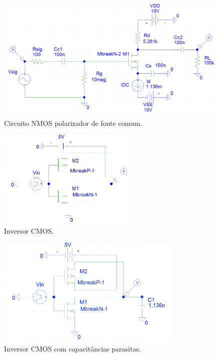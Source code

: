 \documentclass[12pt, a4paper]{article}
\begin{document}
    \begin{figure}[h!] 
        \centering
        \includegraphics[width=1\textwidth]{circ32}
        \caption{Circuito NMOS polarizador de fonte comum.}        
        \label{circ32}
    \end{figure}
    
    \newpage
    
    \begin{figure}[h!] 
        \centering
        \includegraphics[width=0.6\textwidth]{circ331}
        \caption{Inversor CMOS.}        
        \label{circ331}
    \end{figure}
    
    \begin{figure}[h!] 
        \centering
        \includegraphics[width=0.8\textwidth]{circ332}
        \caption{Inversor CMOS com capacitâncias parasitas.}        
        \label{circ332}
    \end{figure}
    
\end{document}

